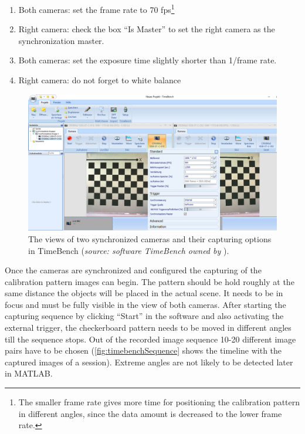 \begin{enumerate}[i]
\item Both cameras: set the frame rate to 70 fps\footnote{The smaller frame rate gives more time for positioning the calibration pattern in different angles, since the data amount is decreased to the lower frame rate.}
\item Right camera: check the box \enquote{Is Master} to set the right camera as the synchronization master.
\item Both cameras: set the exposure time slightly shorter than 1/frame rate.
\item Right camera: do not forget to white balance 
\end{enumerate}

\begin{figure}[htbp]
		\centering
		\includegraphics[width=1.0\textwidth]{figures/timebenchRecord}
		\caption[The views of two synchronized cameras and their capturing options in TimeBench]{The views of two synchronized cameras and their capturing options in TimeBench (\textit{source: software TimeBench owned by} \cite{Optronis.2016}).}
		\label{fig:timebanchRecord}
\end{figure}

Once the cameras are synchronized and configured the capturing of the calibration pattern images can begin. The pattern should be hold roughly at the same distance the objects will be placed in the actual scene. It needs to be in focus and must be fully visible in the view of both cameras. After starting the capturing sequence by clicking \enquote{Start} in the software and also activating the external trigger, the checkerboard pattern needs to be moved in different angles till the sequence stops. Out of the recorded image sequence 10-20 different image pairs have to be chosen (\autoref{fig:timebenchSequence} shows the timeline with the captured images of a session). Extreme angles are not likely to be detected later in MATLAB. 

